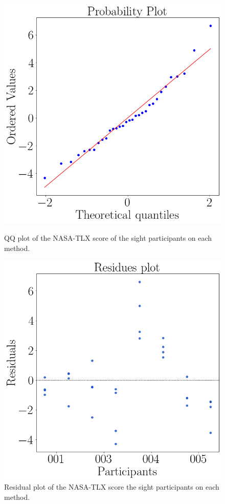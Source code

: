 \begin{figure}[!htb]
    \centering
    \begin{minipage}{0.45\textwidth}
        \centering
        \includegraphics[width = 0.8\linewidth]{Resultados/Nasa/Figuras/png/qqplot_nasa_avg_two_way_sight.png}
        \caption{QQ plot of the NASA-TLX score of the sight participants on each method.}
        \label{fig:qqplot_nasa_avg_two_way_sight}
    \end{minipage}
    \begin{minipage}{0.45\textwidth}
        \centering
        \includegraphics[width = 0.8\linewidth]{Resultados/Nasa/Figuras/png/residplot_nasa_avg_two_way_sight.png}
        \caption{Residual plot of the NASA-TLX score the sight participants on each method.}
        \label{fig:residplot_nasa_avg_two_way_sight}
    \end{minipage}
\end{figure}

